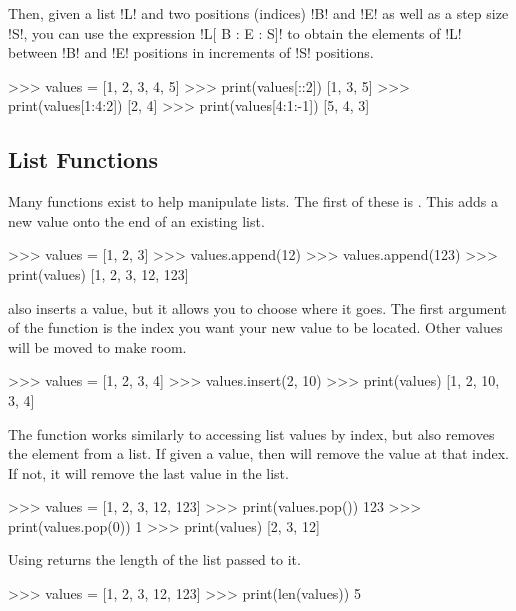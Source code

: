 \documentclass[11pt]{cselabheader}
\begin{document}
Then, given a list \pythoninline!L! and two positions (indices) \pythoninline!B! and
\pythoninline!E! as well as a step size \pythoninline!S!, you can use the expression
\pythoninline!L[ B : E : S]! to obtain the elements of \pythoninline!L! between
\pythoninline!B! and \pythoninline!E! positions in increments of \pythoninline!S!
positions.

\begin{pyconcode}
>>> values = [1, 2, 3, 4, 5]
>>> print(values[::2])
[1, 3, 5]
>>> print(values[1:4:2])
[2, 4]
>>> print(values[4:1:-1])
[5, 4, 3]
\end{pyconcode}

\subsection{List Functions}
Many functions exist to help manipulate lists. The first of these is
. This adds a new value onto the end of an existing list.

\begin{pyconcode}
>>> values = [1, 2, 3]
>>> values.append(12)
>>> values.append(123)
>>> print(values)
[1, 2, 3, 12, 123]
\end{pyconcode}

 also inserts a value, but it allows you to choose where it
goes. The first argument of the function is the index you want your new value to
be located. Other values will be moved to make room.

\begin{pyconcode}
>>> values = [1, 2, 3, 4]
>>> values.insert(2, 10)
>>> print(values)
[1, 2, 10, 3, 4]
\end{pyconcode}

The  function works similarly to accessing list values by
index, but also removes the element from a list. If given a value, then
 will remove the value at that index. If not, it will remove
the last value in the list.

\begin{pyconcode}
>>> values = [1, 2, 3, 12, 123]
>>> print(values.pop())
123
>>> print(values.pop(0))
1
>>> print(values)
[2, 3, 12]
\end{pyconcode}


Using  returns the length of the list passed to it.

\begin{pyconcode}
>>> values = [1, 2, 3, 12, 123]
>>> print(len(values))
5
\end{pyconcode}
\end{document}
